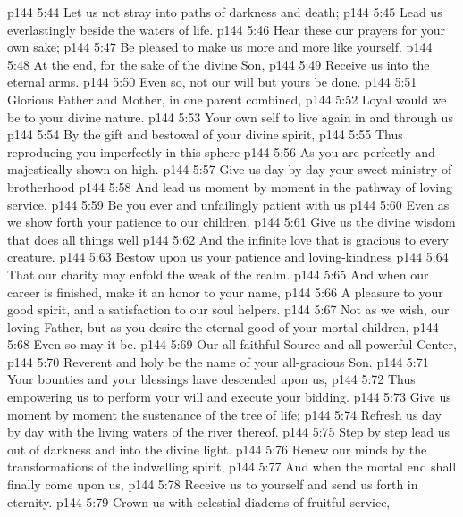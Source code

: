 \vs p144 5:44 Let us not stray into paths of darkness and death;
\vs p144 5:45 \hsetoff Lead us everlastingly beside the waters of life.
\vs p144 5:46 Hear these our prayers for your own sake;
\vs p144 5:47 \hsetoff Be pleased to make us more and more like yourself.
\vs p144 5:48 At the end, for the sake of the divine Son,
\vs p144 5:49 \hsetoff Receive us into the eternal arms.
\vs p144 5:50 Even so, not our will but yours be done.
\separatorline
\vs p144 5:51 Glorious Father and Mother, in one parent combined,
\vs p144 5:52 \hsetoff Loyal would we be to your divine nature.
\vs p144 5:53 Your own self to live again in and through us
\vs p144 5:54 \hsetoff By the gift and bestowal of your divine spirit,
\vs p144 5:55 Thus reproducing you imperfectly in this sphere
\vs p144 5:56 \hsetoff As you are perfectly and majestically shown on high.
\vs p144 5:57 Give us day by day your sweet ministry of brotherhood
\vs p144 5:58 \hsetoff And lead us moment by moment in the pathway of loving service.
\vs p144 5:59 Be you ever and unfailingly patient with us
\vs p144 5:60 \hsetoff Even as we show forth your patience to our children.
\vs p144 5:61 Give us the divine wisdom that does all things well
\vs p144 5:62 \hsetoff And the infinite love that is gracious to every creature.
\vs p144 5:63 Bestow upon us your patience and loving\hyp{}kindness
\vs p144 5:64 \hsetoff That our charity may enfold the weak of the realm.
\vs p144 5:65 And when our career is finished, make it an honor to your name,
\vs p144 5:66 \hsetoff A pleasure to your good spirit, and a satisfaction to our soul helpers.
\vs p144 5:67 Not as we wish, our loving Father, but as you desire the eternal good of your mortal children,
\vs p144 5:68 \hsetoff Even so may it be.
\separatorline
\vs p144 5:69 Our all\hyp{}faithful Source and all\hyp{}powerful Center,
\vs p144 5:70 \hsetoff Reverent and holy be the name of your all\hyp{}gracious Son.
\vs p144 5:71 Your bounties and your blessings have descended upon us,
\vs p144 5:72 \hsetoff Thus empowering us to perform your will and execute your bidding.
\vs p144 5:73 Give us moment by moment the sustenance of the tree of life;
\vs p144 5:74 \hsetoff Refresh us day by day with the living waters of the river thereof.
\vs p144 5:75 Step by step lead us out of darkness and into the divine light.
\vs p144 5:76 \hsetoff Renew our minds by the transformations of the indwelling spirit,
\vs p144 5:77 And when the mortal end shall finally come upon us,
\vs p144 5:78 \hsetoff Receive us to yourself and send us forth in eternity.
\vs p144 5:79 Crown us with celestial diadems of fruitful service,

